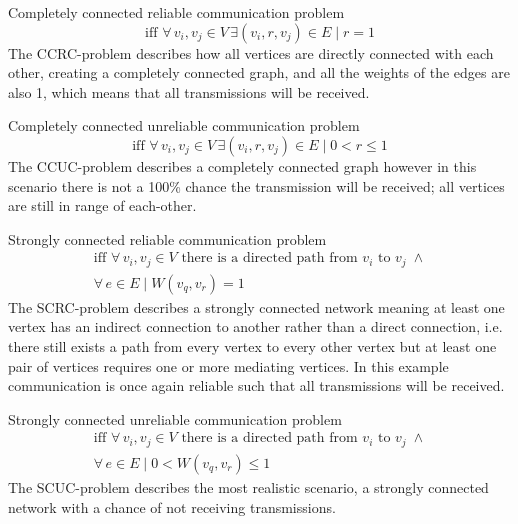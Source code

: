 \begin{description}[itemsep=2em]
    \item[CCRC-problem:] Completely connected reliable communication problem   
    \begin{equation}
    \text{iff } \forall\, v_i, v_j \in V \, \exists (v_i,r,v_j)\in E \mid r = 1    
    \end{equation}
    The CCRC-problem describes how all vertices are directly connected with each other, creating a completely connected graph, and all the weights of the edges are also 1, which means that all transmissions will be received. 
    
    \item[CCUC-problem:] Completely connected unreliable communication problem
    \begin{equation}
    \text{iff } \forall\, v_i, v_j \in V \, \exists (v_i,r,v_j)\in E \mid 0 < r \leq 1
    \end{equation}
    The CCUC-problem describes a completely connected graph however in this scenario there is not a 100\% chance the transmission will be received; all vertices are still in range of each-other. 
    
    \item[SCRC-problem:] Strongly connected reliable communication problem
    \begin{equation}
    \begin{gathered}
    \text{iff } \forall\, v_i, v_j \in V \text{ there is a directed path from } v_i \text{ to } v_j\; \land \\ \forall\, e \in E \mid W(v_q, v_r) = 1
    \end{gathered}  
    \end{equation}   
    The SCRC-problem describes a strongly connected network meaning at least one vertex has an indirect connection to another rather than a direct connection, i.e. there still exists a path from every vertex to every other vertex but at least one pair of vertices requires one or more mediating vertices. In this example communication is once again reliable such that all transmissions will be received. 
    
    \item[SCUC-problem:] Strongly connected unreliable communication problem
    \begin{equation}
    \begin{gathered}
    \text{iff } \forall\, v_i, v_j \in V \text{ there is a directed path from } v_i \text{ to } v_j\; \land \\ \forall\, e \in E \mid 0 < W(v_q, v_r) \leq 1
    \end{gathered}  
    \end{equation}    
    The SCUC-problem describes the most realistic scenario, a strongly connected network with a chance of not receiving transmissions. 
\end{description}
